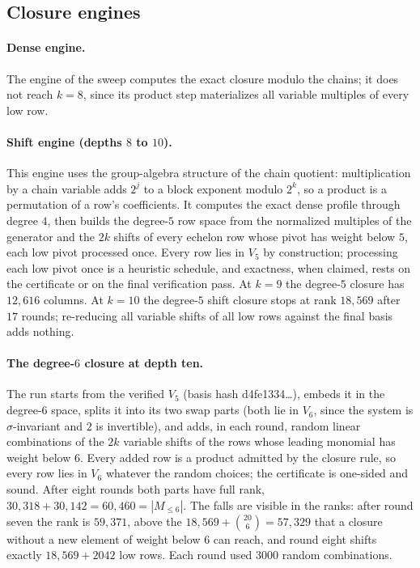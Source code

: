 \documentclass[11pt]{article}
\theoremstyle{definition}\newtheorem{definition}[theorem]{Definition}
\theoremstyle{remark}\newtheorem{remark}[theorem]{Remark}
\newcommand{\codeus}{\textunderscore\allowbreak}
\newcommand{\code}[1]{{\ttfamily\let\_\codeus#1}}
\begin{document}
\subsection{Closure engines}\label{app:engines}
\paragraph{Dense engine.} The engine of the sweep computes the exact
closure modulo the chains; it does not reach $k=8$, since its product step
materializes all variable multiples of every low row.

\paragraph{Shift engine (depths $8$ to $10$).} This engine uses the
group-algebra structure of the chain quotient: multiplication by a chain
variable adds $2^j$ to a block exponent modulo $2^k$, so a product is a
permutation of a row's coefficients. It computes the exact dense profile
through degree $4$, then builds the degree-$5$ row space from the
normalized multiples of the generator and the $2k$ shifts of every echelon
row whose pivot has weight below $5$, each low pivot processed once. Every
row lies in $V_5$ by construction; processing each low pivot once is a
heuristic schedule, and exactness, when claimed, rests on the certificate
or on the final verification pass. At $k=9$ the degree-$5$ closure has
$12{,}616$ columns. At $k=10$ the degree-$5$ shift closure stops at rank $18{,}569$ after $17$
rounds; re-reducing all variable shifts of all low rows against the final
basis adds nothing.

\paragraph{The degree-$6$ closure at depth ten.} The run starts from the
verified $V_5$ (basis hash \code{d4fe1334\ldots}), embeds it in the
degree-$6$ space, splits it into its two swap parts (both lie in $V_6$,
since the system is $\sigma$-invariant and $2$ is invertible), and adds, in
each round, random linear combinations of the $2k$ variable shifts of the
rows whose leading monomial has weight below $6$. Every added row is a
product admitted by the closure rule, so every row lies in $V_6$ whatever
the random choices; the certificate is one-sided and sound. After eight
rounds both parts have full rank, $30{,}318+30{,}142=60{,}460=|M_{\le6}|$.
The falls are visible in the ranks: after round seven the rank is
$59{,}371$, above the $18{,}569+\binom{20}{6}=57{,}329$ that a closure
without a new element of weight below $6$ can reach, and round eight shifts
exactly $18{,}569+2042$ low rows. Each round used $3000$ random
combinations.
\end{document}
